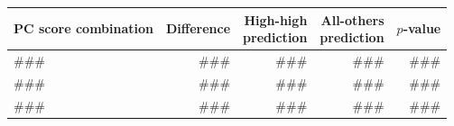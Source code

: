 \begin{table}[h]
\label{tab:pc_score_combo_k2_top3}
\begin{tabular}{p{5.5cm}rrrr}
\toprule
PC score combination & Difference & \shortstack{High-high\\prediction} & \shortstack{All-others\\prediction} & $p$-value \\
\midrule
### & ### & ### & ### & ### \\
### & ### & ### & ### & ### \\
### & ### & ### & ### & ### \\
\bottomrule
\end{tabular}
\end{table}
